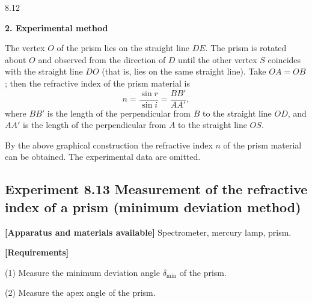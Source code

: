 \begin{figbox}{8.12}
\end{figbox}

\textbf{2. Experimental method}

The vertex $O$ of the prism lies on the straight line $DE$. The prism is rotated about $O$ and observed from the direction of $D$ until the other vertex $S$ coincides with the straight line $DO$ (that is, lies on the same straight line). Take $OA=OB$; then the refractive index of the prism material is
\[
n=\frac{\sin r}{\sin i}=\frac{BB'}{AA'},
\]
where $BB'$ is the length of the perpendicular from $B$ to the straight line $OD$, and $AA'$ is the length of the perpendicular from $A$ to the straight line $OS$.

By the above graphical construction the refractive index $n$ of the prism material can be obtained. The experimental data are omitted.

\subsection*{Experiment 8.13 \quad Measurement of the refractive index of a prism (minimum deviation method)}

\textbf{[Apparatus and materials available]} Spectrometer, mercury lamp, prism.

\textbf{[Requirements]}

(1) Measure the minimum deviation angle $\delta_{\min}$ of the prism.

(2) Measure the apex angle of the prism.

